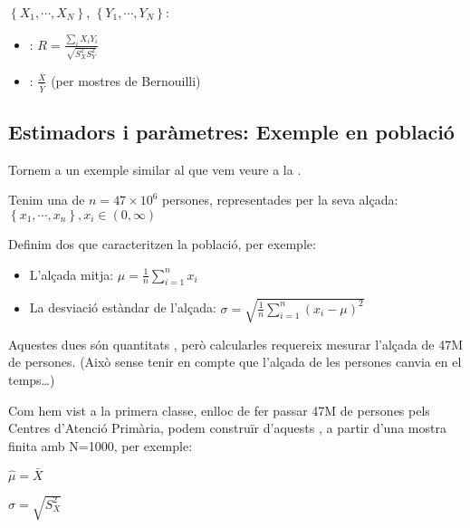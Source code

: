 \documentclass[letterpaper,10pt,english]{sphinxmanual}
\begin{document}
 \(\left\{X_1, \cdots, X_N\right\}\), \(\left\{Y_1, \cdots, Y_N\right\}\):
\begin{itemize}
\item {} 
:  \(R = \frac{\sum_{i}X_i Y_i}{\sqrt{S^2_X S^2_Y}}\)

\item {} 
: \(\frac{\bar{X}}{\bar{Y}}\) (per mostres de Bernouilli)

\end{itemize}


\subsection{Estimadors i paràmetres: Exemple en població }
\label{\detokenize{0_Intro/0_2_Intro_stats:estimadors-i-parametres-exemple-en-poblacio-finita}}
Tornem a un exemple similar al que vem veure a la .

Tenim una  de \(n=47 \times 10^6\) persones, representades per la seva alçada:
\(\left\{x_1, \cdots, x_n\right\}, x_i\in \left(0, \infty\right)\)

Definim dos  que caracteritzen la població, per exemple:
\begin{itemize}
\item {} 
L’alçada mitja: \(\mu = \frac{1}{n}\sum_{i=1}^n x_i\)

\item {} 
La desviació estàndar de l’alçada: \(\sigma = \sqrt{ \frac{1}{n}\sum_{i=1}^n (x_i - \mu)^2}\)

\end{itemize}

Aquestes dues són quantitats , però calcular\sphinxhyphen{}les requereix mesurar l’alçada de 47M de persones.
(Això sense tenir en compte que l’alçada de les persones canvia en el temps…)

Com hem vist a la primera classe, enlloc de fer passar 47M de persones
pels Centres d’Atenció Primària, podem construïr  d’aquests ,
a partir d’una mostra finita amb N=1000, per exemple:

\(\hat{\mu} = \bar{X}\)

\(\hat{\sigma} = \sqrt{S^2_X}\)
\end{document}
